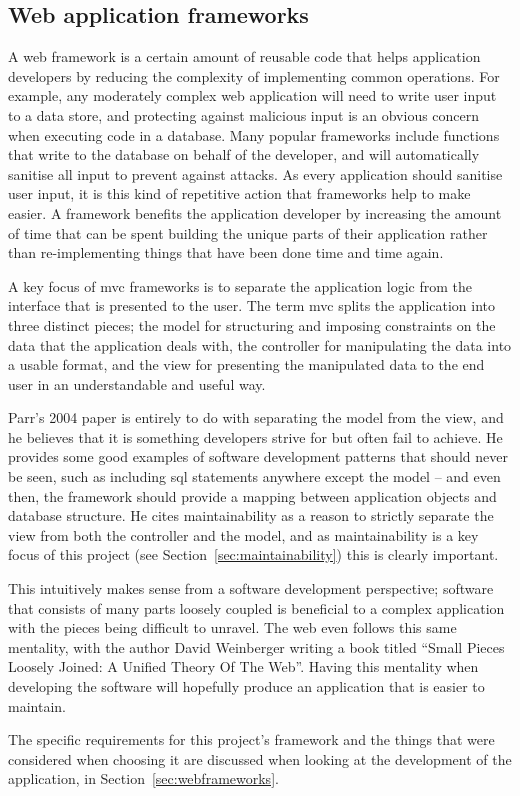 
\subsection{Web application frameworks}


A web framework is a certain amount of reusable code that helps application
developers by reducing the complexity of implementing common operations. For
example, any moderately complex web application will need to write user input
to a data store, and protecting against malicious input is an obvious concern
when executing code in a database. Many popular frameworks include functions
that write to the database on behalf of the developer, and will automatically
sanitise all input to prevent against attacks. As every application should
sanitise user input, it is this kind of repetitive action that frameworks help
to make easier. A framework benefits the application developer by increasing
the amount of time that can be spent building the unique parts of their
application rather than re-implementing things that have been done time and
time again.

A key focus of \gls{mvc} frameworks is to separate the application logic from
the interface that is presented to the user. The term \gls{mvc} splits the
application into three distinct pieces; the model for structuring and imposing
constraints on the data that the application deals with, the controller for
manipulating the data into a usable format, and the view for presenting the
manipulated data to the end user in an understandable and useful way.

Parr's 2004 paper \cite{Parr2004templateengines} is entirely to do with
separating the model from the view, and he believes that it is something
developers strive for but often fail to achieve. He provides some good
examples of software development patterns that should never be seen, such as
including \gls{sql} statements anywhere except the model -- and even then, the
framework should provide a mapping between application objects and database
structure. He cites maintainability as a reason to strictly separate the view
from both the controller and the model, and as maintainability is a key focus
of this project (see Section~\ref{sec:maintainability}) this is clearly
important.

This intuitively makes sense from a software development perspective; software
that consists of many parts loosely coupled is beneficial to a complex
application with the pieces being difficult to unravel. The web even follows
this same mentality, with the author David Weinberger writing a book titled
``Small Pieces Loosely Joined: A Unified Theory Of The Web''. Having this
mentality when developing the software will hopefully produce an application
that is easier to maintain.

The specific requirements for this project's framework and the things that
were considered when choosing it are discussed when looking at the development
of the application, in Section~\ref{sec:webframeworks}.
